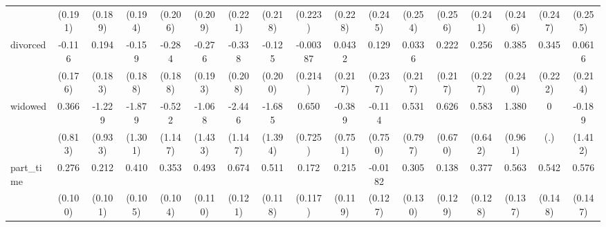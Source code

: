 {\begin{tabular}{l*{16}{c}}
                    &     (0.191)         &     (0.189)         &     (0.194)         &     (0.206)         &     (0.209)         &     (0.221)         &     (0.218)         &     (0.223)         &     (0.228)         &     (0.245)         &     (0.254)         &     (0.256)         &     (0.241)         &     (0.246)         &     (0.247)         &     (0.255)         \\
[1em]
divorced            &      -0.116         &       0.194         &      -0.159         &      -0.284         &      -0.276         &      -0.338         &      -0.125         &    -0.00387         &      0.0432         &       0.129         &      0.0336         &       0.222         &       0.256         &       0.385         &       0.345         &      0.0616         \\
                    &     (0.176)         &     (0.183)         &     (0.188)         &     (0.188)         &     (0.193)         &     (0.208)         &     (0.200)         &     (0.214)         &     (0.217)         &     (0.237)         &     (0.217)         &     (0.217)         &     (0.227)         &     (0.240)         &     (0.222)         &     (0.214)         \\
[1em]
widowed             &       0.366         &      -1.229         &      -1.879         &      -0.522         &      -1.068         &      -2.446\sym{*}  &      -1.685         &       0.650         &      -0.389         &      -0.114         &       0.531         &       0.626         &       0.583         &       1.380         &           0         &      -0.189         \\
                    &     (0.813)         &     (0.933)         &     (1.301)         &     (1.147)         &     (1.433)         &     (1.147)         &     (1.394)         &     (0.725)         &     (0.751)         &     (0.750)         &     (0.797)         &     (0.670)         &     (0.642)         &     (0.961)         &         (.)         &     (1.412)         \\
[1em]
part\_time           &       0.276\sym{**} &       0.212\sym{*}  &       0.410\sym{***}&       0.353\sym{***}&       0.493\sym{***}&       0.674\sym{***}&       0.511\sym{***}&       0.172         &       0.215         &     -0.0182         &       0.305\sym{*}  &       0.138         &       0.377\sym{**} &       0.563\sym{***}&       0.542\sym{***}&       0.576\sym{***}\\
                    &     (0.100)         &     (0.101)         &     (0.105)         &     (0.104)         &     (0.110)         &     (0.121)         &     (0.118)         &     (0.117)         &     (0.119)         &     (0.127)         &     (0.130)         &     (0.129)         &     (0.128)         &     (0.137)         &     (0.148)         &     (0.147)         \\

\end{tabular}}
